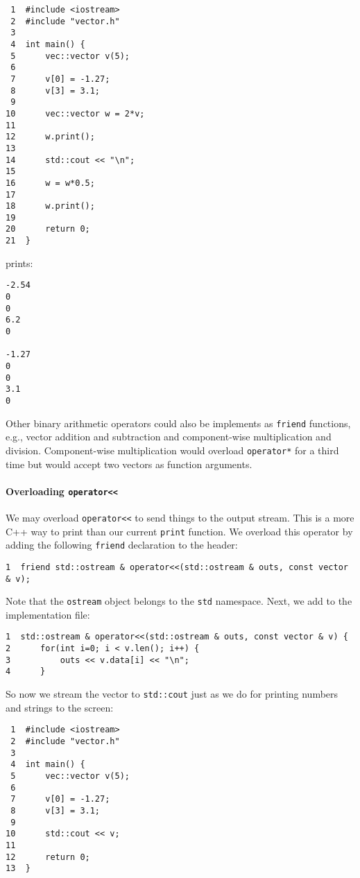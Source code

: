 \documentclass[11pt]{article}
\begin{document}
\begin{verbatim}
 1  #include <iostream>
 2  #include "vector.h"
 3  
 4  int main() {
 5      vec::vector v(5);
 6  
 7      v[0] = -1.27;
 8      v[3] = 3.1;
 9  
10      vec::vector w = 2*v;
11  
12      w.print();
13  
14      std::cout << "\n";
15  
16      w = w*0.5;
17  
18      w.print();
19  
20      return 0;
21  }
\end{verbatim}

prints:

\begin{verbatim}
-2.54
0
0
6.2
0

-1.27
0
0
3.1
0
\end{verbatim}

Other binary arithmetic operators could also be implements as \texttt{friend} 
functions, e.g., vector addition and subtraction and component-wise 
multiplication and division. Component-wise multiplication would overload 
\texttt{operator*} for a third time but would accept two vectors as function 
arguments.

\paragraph{Overloading \texttt{operator<<}}
\label{sec:orgheadline57}
We may overload \texttt{operator<<} to send things to the output stream. This 
is a more C++ way to print than our current \texttt{print} function. We overload
this operator by adding the following \texttt{friend} declaration to the header:

\begin{verbatim}
1  friend std::ostream & operator<<(std::ostream & outs, const vector & v);
\end{verbatim}

Note that the \texttt{ostream} object belongs to the \texttt{std} namespace. Next, we
add to the implementation file:

\begin{verbatim}
1  std::ostream & operator<<(std::ostream & outs, const vector & v) {
2      for(int i=0; i < v.len(); i++) {
3          outs << v.data[i] << "\n";
4      }
\end{verbatim}

So now we stream the vector to \texttt{std::cout} just as we do for printing 
numbers and strings to the screen:

\begin{verbatim}
 1  #include <iostream>
 2  #include "vector.h"
 3  
 4  int main() {
 5      vec::vector v(5);
 6  
 7      v[0] = -1.27;
 8      v[3] = 3.1;
 9  
10      std::cout << v;
11  
12      return 0;
13  }
\end{verbatim}
\end{document}
